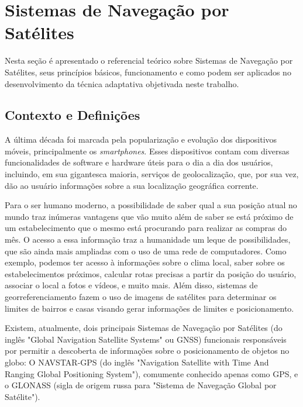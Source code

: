 \section{Sistemas de Navegação por Satélites}
\label{sec:GNSS}
Nesta seção é apresentado o referencial teórico sobre Sistemas de Navegação por Satélites, seus princípios básicos, funcionamento e como podem ser aplicados no desenvolvimento da técnica adaptativa objetivada neste trabalho.

\subsection{Contexto e Definições}

A última década foi marcada pela popularização e evolução dos dispositivos móveis, principalmente os \emph{smartphones}. Esses dispositivos contam com diversas funcionalidades de software e hardware úteis para o dia a dia dos usuários, incluindo, em sua gigantesca maioria, serviços de geolocalização, que, por sua vez, dão ao usuário informações sobre a sua localização geográfica corrente.

Para o ser humano moderno, a possibilidade de saber qual a sua posição atual no mundo traz inúmeras vantagens que vão muito além de saber se está próximo de um estabelecimento que o mesmo está procurando para realizar as compras do mês. O acesso a essa informação traz a humanidade um leque de possibilidades, que são ainda mais ampliadas com o uso de uma rede de computadores. Como exemplo, podemos ter acesso à informações sobre o clima local, saber sobre os estabelecimentos próximos, calcular rotas precisas a partir da posição do usuário, associar o local a fotos e vídeos, e muito mais. Além disso, sistemas de georreferenciamento fazem o uso de imagens de satélites para determinar os limites de bairros e casas visando gerar informações de limites e posicionamento.

Existem, atualmente, dois principais Sistemas de Navegação por Satélites (do inglês "Global Navigation Satellite Systems" ou GNSS) funcionais responsáveis por permitir a descoberta de informações sobre o posicionamento de objetos no globo: O NAVSTAR-GPS (do inglês "Navigation Satellite with Time And Ranging Global Positioning System"), comumente conhecido apenas como GPS, e o GLONASS (sigla de origem russa para "Sistema de Navegação Global por Satélite"). 


